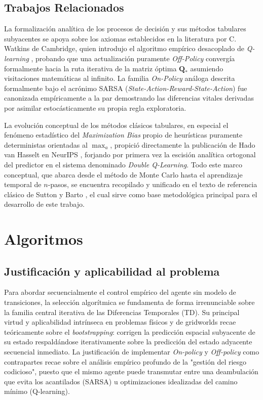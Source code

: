 \subsection{Trabajos Relacionados}
La formalización analítica de los procesos de decisión y sus métodos tabulares subyacentes se apoya sobre los axiomas establecidos en la literatura por C. Watkins de Cambridge, quien introdujo el algoritmo empírico desacoplado de \textit{Q-learning} \cite{Watkins1989}, probando que una actualización puramente \textit{Off-Policy} convergía formalmente hacia la ruta iterativa de la matriz óptima $\mathbf{Q_*}$ asumiendo visitaciones matemáticas al infinito.
La familia \textit{On-Policy} análoga descrita formalmente bajo el acrónimo SARSA (\textit{State-Action-Reward-State-Action}) fue canonizada empíricamente a la par demostrando las diferencias vitales derivadas por asimilar estocásticamente su propia regla exploratoria.

La evolución conceptual de los métodos clásicos tabulares, en especial el fenómeno estadístico del \textit{Maximization Bias} propio de heurísticas puramente deterministas orientadas al $\max_{a}$, propició directamente la publicación de Hado van Hasselt en NeurIPS \cite{Hasselt2010DD}, forjando por primera vez la escisión analítica ortogonal del predictor en el sistema denominado \textit{Double Q-Learning}.
Todo este marco conceptual, que abarca desde el método de Monte Carlo hasta el aprendizaje temporal de $n$-pasos, se encuentra recopilado y unificado en el texto de referencia clásico de Sutton y Barto \cite{Sutton1998}, el cual sirve como base metodológica principal para el desarrollo de este trabajo.

\section{Algoritmos}

\subsection{Justificación y aplicabilidad al problema}
Para abordar secuencialmente el control empírico del agente sin modelo de transiciones, la selección algorítmica se fundamenta de forma irrenunciable sobre la familia central iterativa de las Diferencias Temporales (TD). Su principal virtud y aplicabilidad intrínseca en problemas físicos y de gridworlds recae teóricamente sobre el \textit{bootstrapping}: corrigen la predicción espacial subyacente de su estado respaldándose iterativamente sobre la predicción del estado adyacente secuencial inmediato. La justificación de implementar \textit{On-policy} y \textit{Off-policy} como contrapartes recae sobre el análisis empírico profundo de la "gestión del riesgo codicioso", puesto que el mismo agente puede transmutar entre una deambulación que evita los acantilados (SARSA) u optimizaciones idealizadas del camino mínimo (Q-learning). 

